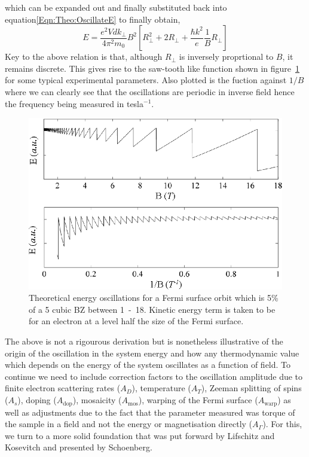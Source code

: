 which can be expanded out and finally substituted back into equation\ref{Eqn:Theo:OscillateE} to finally obtain,
\begin{equation}
\label{Eqn:Theo:OscIllustration}
E = \frac{e^2Vdk_\perp}{4\pi^2m_0}B^2\left[R_\perp^2 + 2R_\perp + \frac{\hbar k^2}{e}\frac{1}{B}R_\perp\right]
\end{equation}
Key to the above relation is that, although $R_\perp$ is inversely proprtional to $B$, it remains discrete. This gives rise to the saw-tooth like function shown in figure~\ref{Fig:Theo:EnergyOscillations} for some typical experimental parameters. Also plotted is the fuction against $1/B$ where we can clearly see that the oscillations are periodic in inverse field hence the frequency being measured in tesla$^{-1}$.
\begin{figure}[htbp]
    \begin{center}
        \includegraphics[scale=0.9]{Chapter-Theory/Figures/TheoreticalOscillations/TheoreticalOscillations}
        \caption{Theoretical energy oscillations for a Fermi surface orbit which is 5\% of a \unit{5}{\angstrom} cubic \ac{BZ} between \unit{1-18}{\tesla}. Kinetic energy term is taken to be for an electron at a level half the size of the Fermi surface.}
        \label{Fig:Theo:EnergyOscillations}
    \end{center}
\end{figure}

The above is not a rigourous derivation but is nonetheless illustrative of the origin of the oscillation in the system energy and how any thermodynamic value which depends on the energy of the system oscillates as a function of field. To continue we need to include correction factors to the oscillation amplitude due to finite electron scattering rates ($A_D$), temperature ($A_T$), Zeeman splitting of spins ($A_s$), doping ($A_{\textrm{dop}}$), mosaicity ($A_{\textrm{mos}}$), warping of the Fermi surface ($A_{\textrm{warp}}$) as well as adjustments due to the fact that the parameter measured was torque of the sample in a field and not the energy or magnetisation directly ($A_{\Gamma}$). For this, we turn to a more solid foundation that was put forward by Lifschitz and Kosevitch and presented by Schoenberg.

